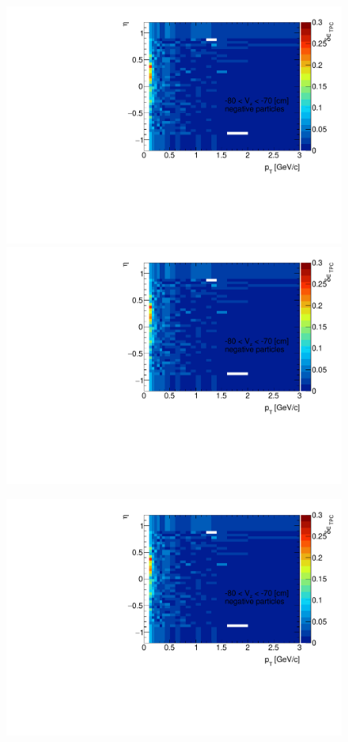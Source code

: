 \begin{figure}[H]
{		\includegraphics[width=\linewidth,page=11]{graphics/systematicsEfficiency/deadMaterial/secondaries_Unbinned_Charged_CD.pdf}
		\includegraphics[width=\linewidth,page=14]{graphics/systematicsEfficiency/deadMaterial/secondaries_Unbinned_Charged_CD.pdf}\\
	}%
	\parbox{0.325\textwidth}{
		\includegraphics[width=\linewidth,page=3]{graphics/systematicsEfficiency/deadMaterial/secondaries_Unbinned_Charged_CD.pdf}\\
}
\end{figure}
